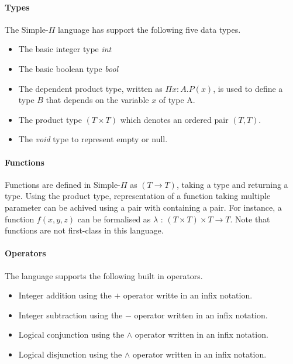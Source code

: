 \documentclass[a4paper,12pt]{report}
\begin{document}
\paragraph{Types} The Simple-$\Pi$ language has support the following five data types. 
\begin{itemize}
  \item The basic integer type \textit{int}
  \item The basic boolean type \textit{bool}
  \item The dependent product type, written as $\Pi x: A.P(x)$, is used to 
  define a type $B$ that depends on the variable $x$ of type A.
  \item The product type $(T \times T)$ which denotes an ordered pair $(T, T)$.
  \item The \textit{void} type to represent empty or null.
\end{itemize}

\paragraph{Functions}
Functions are defined in Simple-$\Pi$ as $(T \longrightarrow T)$, taking a type 
and returning a type. Using the product type, representation of a function 
taking multiple parameter can be achived using a pair with containing a pair. 
For instance, a function $f(x,y,z)$ can be formalised as 
$\lambda$ : $(T \times T) \times T \longrightarrow T$. Note that functions are 
not first-class in this language.

\paragraph{Operators}
The language supports the following built in operators.
\begin{itemize}
  \item Integer addition using the $+$ operator writte in an infix notation.
  \item Integer subtraction using the $-$ operator written in an infix notation.
  \item Logical conjunction using the $\wedge$ operator written in an infix 
  notation.
  \item Logical disjunction using the $\wedge$ operator written in an infix 
  notation.
\end{itemize}
\end{document}
